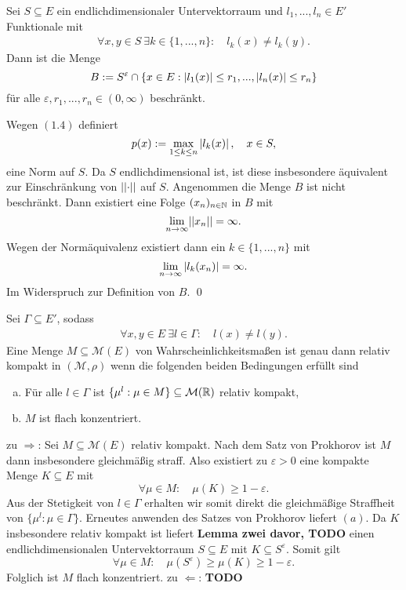 \begin{lemma}
    Sei $S \subseteq E$ ein endlichdimensionaler Untervektorraum und $l_1,...,l_n \in E'$ Funktionale mit 
    \begin{align}
        \forall x,y \in S \ \exists k \in \{1,...,n\}: \quad l_k(x) \neq l_k(y).
    \end{align}
    Dann ist die Menge 
    $$
        B := S^{\varepsilon} \cap \{x \in E: \left| l_1(x) \right| \leq r_1,...,\left| l_n(x) \right|\leq r_n\}
    $$
    für alle $\varepsilon, r_1,...,r_n \in (0, \infty)$ beschränkt. 
\end{lemma}

\begin{proof*}
    Wegen $(1.4)$ definiert 
    $$
        p(x) := \max_{1\leq k \leq n} \left| l_k(x) \right|, \quad x \in S,
    $$
    eine Norm auf $S$. Da $S$ endlichdimensional ist, ist diese insbesondere äquivalent zur Einschränkung von $\lvert\lvert \cdot \rvert\rvert$ auf $S$. 
    Angenommen die Menge $B$ ist nicht beschränkt. Dann existiert eine Folge $(x_n)_{n \in \mathbb{N}}$ in $B$ mit 
    $$
        \lim_{n \to \infty} \lvert\lvert x_n \rvert\rvert = \infty. 
    $$
    Wegen der Normäquivalenz existiert dann ein $k \in \{1,...,n\}$ mit 
    $$
        \lim_{n \to \infty}\left| l_k(x_n) \right| = \infty. 
    $$
    Im Widerspruch zur Definition von $B$. \qed
\end{proof*}

\begin{theorem}
    Sei $\Gamma \subseteq E'$, sodass 
    \begin{align}
        \forall x,y \in E \ \exists l \in \Gamma: \quad l(x) \neq l(y).
    \end{align}
    Eine Menge $M \subseteq \mathcal{M}(E)$ von Wahrscheinlichkeitsmaßen ist genau dann relativ kompakt in $(\mathcal{M}, \rho)$ wenn die folgenden beiden Bedingungen erfüllt sind
    \begin{enumerate}[(a)]
        \item Für alle $l \in \Gamma$ ist $\{\mu^l : \mu \in M\} \subseteq \mathcal{M}(\mathbb{R})$ relativ kompakt,
        \item $M$ ist flach konzentriert. 
    \end{enumerate}
\end{theorem}

\begin{proof*}
    zu $\Rightarrow$: 
    Sei $M \subseteq \mathcal{M}(E)$ relativ kompakt. Nach dem Satz von Prokhorov ist $M$ dann insbesondere gleichmäßig straff. 
    Also existiert zu $\varepsilon > 0$ eine kompakte Menge $K \subseteq E$ mit 
    $$
        \forall \mu \in M: \quad \mu(K) \geq 1 - \varepsilon.   
    $$ 
    Aus der Stetigkeit von $l \in \Gamma$ erhalten wir somit direkt die gleichmäßige Straffheit von $\{\mu^l : \mu \in \Gamma\}$. Erneutes anwenden des Satzes von Prokhorov liefert $(a)$. 
    Da $K$ insbesondere relativ kompakt ist liefert \textbf{Lemma zwei davor, TODO} einen endlichdimensionalen Untervektorraum $S \subseteq E$ mit $K \subseteq S^{\varepsilon}$. Somit gilt
    $$
        \forall \mu \in M: \quad \mu(S^{\varepsilon}) \geq \mu(K) \geq 1 - \varepsilon.
    $$
    Folglich ist $M$ flach konzentriert. 
    \newline 
    zu $\Leftarrow$: 
    \textbf{TODO}
\end{proof*}

